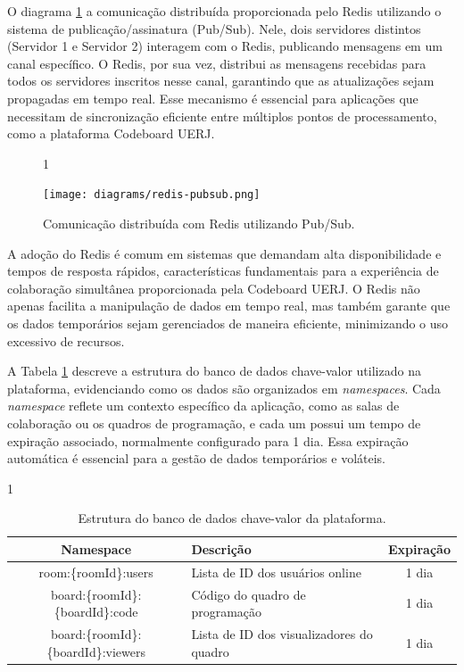 O diagrama \ref{fig:redis-pubsub} a comunicação distribuída proporcionada pelo Redis utilizando o sistema de publicação/assinatura (Pub/Sub). Nele, dois servidores distintos (Servidor 1 e Servidor 2) interagem com o Redis, publicando mensagens em um canal específico. O Redis, por sua vez, distribui as mensagens recebidas para todos os servidores inscritos nesse canal, garantindo que as atualizações sejam propagadas em tempo real. Esse mecanismo é essencial para aplicações que necessitam de sincronização eficiente entre múltiplos pontos de processamento, como a plataforma Codeboard UERJ.

\begin{figure}[H]{1\textwidth}
    \centering
    \caption{Comunicação distribuída com Redis utilizando Pub/Sub.}
    \label{fig:redis-pubsub}
    \texttt{[image: diagrams/redis-pubsub.png]}
\end{figure}


A adoção do Redis é comum em sistemas que demandam alta disponibilidade e tempos de resposta rápidos, características fundamentais para a experiência de colaboração simultânea proporcionada pela Codeboard UERJ. O Redis não apenas facilita a manipulação de dados em tempo real, mas também garante que os dados temporários sejam gerenciados de maneira eficiente, minimizando o uso excessivo de recursos.

A Tabela \ref{tab:key-value-database} descreve a estrutura do banco de dados chave-valor utilizado na plataforma, evidenciando como os dados são organizados em \emph{namespaces}. Cada \emph{namespace} reflete um contexto específico da aplicação, como as salas de colaboração ou os quadros de programação, e cada um possui um tempo de expiração associado, normalmente configurado para 1 dia. Essa expiração automática é essencial para a gestão de dados temporários e voláteis.

\begin{table}[H]{1\textwidth}
    \centering
    \caption{Estrutura do banco de dados chave-valor da plataforma.}
    \label{tab:key-value-database}
    \renewcommand{\arraystretch}{1.3} 
    \begin{tabular}{|c|p{6cm}|c|}
        \hline
        \textbf{Namespace}                   & \textbf{Descrição}                       & \textbf{Expiração} \\
        \hline
        room:\{roomId\}:users                & Lista de ID dos usuários online          & 1 dia              \\
        \hline
        board:\{roomId\}:\{boardId\}:code    & Código do quadro de programação          & 1 dia              \\
        \hline
        board:\{roomId\}:\{boardId\}:viewers & Lista de ID dos visualizadores do quadro & 1 dia              \\ 
        
        \hline
    \end{tabular}
\end{table}


